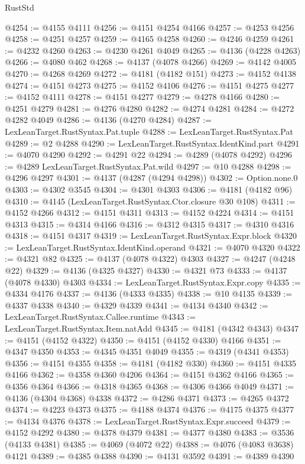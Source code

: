 \begin{lexlean}{RustStd}
\begin{coremodule}
{\begin{coremodule}
{{{{{{{{{{{{{{{{{{{{{{{{{{{{{{{{{{{{{{{{{{{{{{{{{{@4254 := @4155 @4111
@4256 := @4151 @4254 @4166
@4257 := @4253 @4256
@4258 := @4251 @4257
@4259 := @4165 @4258
@4260 := @4246 @4259
@4261 := @4232 @4260
@4263 := @4230 @4261 @4049
@4265 := @4136 (@4228 @4263)
@4266 := @4080 @462
@4268 := @4137 (@4078 @4266)
@4269 := @4142 @4005
@4270 := @4268 @4269
@4272 := @4181 (@4182 @151)
@4273 := @4152 @4138
@4274 := @4151 @4273
@4275 := @4152 @4106
@4276 := @4151 @4275
@4277 := @4152 @4111
@4278 := @4151 @4277
@4279 := @4278 @4166
@4280 := @4251 @4279
@4281 := @4276 @4280
@4282 := @4274 @4281
@4284 := @4272 @4282 @4049
@4286 := @4136 (@4270 @4284)
@4287 := LexLeanTarget.RustSyntax.Pat.tuple
@4288 := LexLeanTarget.RustSyntax.Pat
@4289 := @2 @4288
@4290 := LexLeanTarget.RustSyntax.IdentKind.part
@4291 := @4070 @4290
@4292 := @4291 @22
@4294 := @4289 (@4078 @4292)
@4296 := @4289 LexLeanTarget.RustSyntax.Pat.wild
@4297 := @10 @4288
@4298 := @4296 @4297
@4301 := @4137 (@4287 (@4294 @4298))
@4302 := Option.none.{0}
@4303 := @4302 @3545
@4304 := @4301 @4303
@4306 := @4181 (@4182 @96)
@4310 := @4145 (LexLeanTarget.RustSyntax.Ctor.closure @30 @108)
@4311 := @4152 @4266
@4312 := @4151 @4311
@4313 := @4152 @4224
@4314 := @4151 @4313
@4315 := @4314 @4166
@4316 := @4312 @4315
@4317 := @4310 @4316
@4318 := @4151 @4317
@4319 := LexLeanTarget.RustSyntax.Expr.block
@4320 := LexLeanTarget.RustSyntax.IdentKind.operand
@4321 := @4070 @4320
@4322 := @4321 @82
@4325 := @4137 (@4078 @4322) @4303
@4327 := @4247 (@4248 @22)
@4329 := @4136 (@4325 @4327)
@4330 := @4321 @73
@4333 := @4137 (@4078 @4330) @4303
@4334 := LexLeanTarget.RustSyntax.Expr.copy
@4335 := @4334 @4176
@4337 := @4136 (@4333 @4335)
@4338 := @10 @4135
@4339 := @4337 @4338
@4340 := @4329 @4339
@4341 := @4134 @4340
@4342 := LexLeanTarget.RustSyntax.Callee.runtime
@4343 := LexLeanTarget.RustSyntax.Item.natAdd
@4345 := @4181 (@4342 @4343)
@4347 := @4151 (@4152 @4322)
@4350 := @4151 (@4152 @4330) @4166
@4351 := @4347 @4350
@4353 := @4345 @4351 @4049
@4355 := @4319 (@4341 @4353)
@4356 := @4151 @4355
@4358 := @4181 (@4182 @330)
@4360 := @4151 @4335 @4166
@4362 := @4358 @4360 @4206
@4364 := @4151 @4362 @4166
@4365 := @4356 @4364
@4366 := @4318 @4365
@4368 := @4306 @4366 @4049
@4371 := @4136 (@4304 @4368) @4338
@4372 := @4286 @4371
@4373 := @4265 @4372
@4374 := @4223 @4373
@4375 := @4188 @4374
@4376 := @4175 @4375
@4377 := @4134 @4376
@4378 := LexLeanTarget.RustSyntax.Expr.succeed
@4379 := @4152 @4292
@4380 := @4378 @4379
@4381 := @4377 @4380
@4383 := @3536 (@4133 @4381)
@4385 := @4069 (@4072 @22)
@4388 := @4076 (@4083 @3638) @4121
@4389 := @4385 @4388
@4390 := @4131 @3592
@4391 := @4389 @4390
}}}}}}}}}}}}}}}}}}}}}}}}}}}}}}}}}}}}}}}}}}}}}}}}}}
\end{coremodule}}
\end{coremodule}
\end{lexlean}
